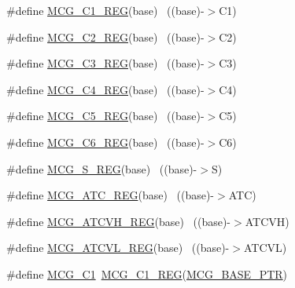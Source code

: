 \begin{DoxyCompactItemize}
\item 
\#define \hyperlink{group___m_c_g___register___accessor___macros_gae34b03d76caea16a8366fb11838560ea}{M\+C\+G\+\_\+\+C1\+\_\+\+R\+EG}(base)                                              ~((base)-\/$>$C1)
\item 
\#define \hyperlink{group___m_c_g___register___accessor___macros_ga81f0c07fe9169d8b0d87c8dc497b4732}{M\+C\+G\+\_\+\+C2\+\_\+\+R\+EG}(base)                                              ~((base)-\/$>$C2)
\item 
\#define \hyperlink{group___m_c_g___register___accessor___macros_ga0a47f442b7ba0665e9536b8d187c2f92}{M\+C\+G\+\_\+\+C3\+\_\+\+R\+EG}(base)                                              ~((base)-\/$>$C3)
\item 
\#define \hyperlink{group___m_c_g___register___accessor___macros_ga8b1f5173fccdea7dfd4e2ea46db8002f}{M\+C\+G\+\_\+\+C4\+\_\+\+R\+EG}(base)                                              ~((base)-\/$>$C4)
\item 
\#define \hyperlink{group___m_c_g___register___accessor___macros_gaf5c35c53a6183c707c255e7a9aeaca49}{M\+C\+G\+\_\+\+C5\+\_\+\+R\+EG}(base)                                              ~((base)-\/$>$C5)
\item 
\#define \hyperlink{group___m_c_g___register___accessor___macros_gadbc313b8733938cb5efd4ffa9050d84b}{M\+C\+G\+\_\+\+C6\+\_\+\+R\+EG}(base)                                              ~((base)-\/$>$C6)
\item 
\#define \hyperlink{group___m_c_g___register___accessor___macros_ga69f3bd6d5a19734d5e76e9948464eb7b}{M\+C\+G\+\_\+\+S\+\_\+\+R\+EG}(base)                                                ~((base)-\/$>$S)
\item 
\#define \hyperlink{group___m_c_g___register___accessor___macros_gae255e0fbd997ba71534c9034763a6549}{M\+C\+G\+\_\+\+A\+T\+C\+\_\+\+R\+EG}(base)                                            ~((base)-\/$>$A\+TC)
\item 
\#define \hyperlink{group___m_c_g___register___accessor___macros_gad874adcb4ac61be011c975d1e0441273}{M\+C\+G\+\_\+\+A\+T\+C\+V\+H\+\_\+\+R\+EG}(base)                                        ~((base)-\/$>$A\+T\+C\+VH)
\item 
\#define \hyperlink{group___m_c_g___register___accessor___macros_ga474ad360067826ccee78bcec3713b1d2}{M\+C\+G\+\_\+\+A\+T\+C\+V\+L\+\_\+\+R\+EG}(base)                                        ~((base)-\/$>$A\+T\+C\+VL)
\item 
\#define \hyperlink{group___m_c_g___register___accessor___macros_ga3f1a2c81a59d97251a06534341ad3303}{M\+C\+G\+\_\+\+C1}~\hyperlink{group___m_c_g___register___accessor___macros_gae34b03d76caea16a8366fb11838560ea}{M\+C\+G\+\_\+\+C1\+\_\+\+R\+EG}(\hyperlink{group___m_c_g___peripheral_gaceefc72e93a47a35f59a31c57dddf41b}{M\+C\+G\+\_\+\+B\+A\+S\+E\+\_\+\+P\+TR})

\end{DoxyCompactItemize}
